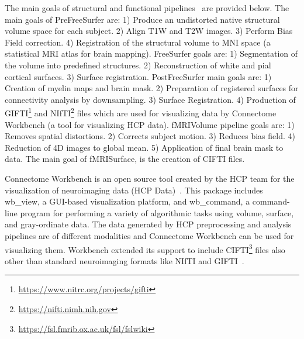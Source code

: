 The main goals of structural and functional pipelines~\cite{Gla13} are provided below. The main goals of PreFreeSurfer are: 1) Produce an undistorted native structural volume space for each subject. 2) Align T1W and T2W images. 3) Perform Bias Field correction. 4) Registration of the structural volume to MNI space (a statistical MRI atlas for brain mapping). FreeSurfer goals are: 1) Segmentation of the volume into predefined structures. 2) Reconstruction of white and pial cortical surfaces. 3) Surface registration. PostFreeSurfer main goals are: 1) Creation of myelin maps and brain mask. 2) Preparation of registered surfaces for connectivity analysis by downsampling. 3) Surface Registration. 4) Production of GIFTI\footnote{\url{https://www.nitrc.org/projects/gifti}} and NIfTI\footnote{\url{https://nifti.nimh.nih.gov}} files which are used for visualizing data by Connectome Workbench (a tool for visualizing HCP data). fMRIVolume pipeline goals are: 1) Removes spatial distortions. 2) Corrects subject motion. 3) Reduces bias field. 4) Reduction of 4D images to global mean. 5) Application of final brain mask to data. The main goal of fMRISurface, is the creation of CIFTI files.

Connectome Workbench is an open source tool created by the HCP team for the visualization of neuroimaging data (HCP Data)~\cite{wb_workbench}. This package includes wb\_view, a GUI-based visualization platform, and wb\_command, a command-line program for performing a variety of algorithmic tasks using volume, surface, and gray-ordinate data. The data generated by HCP preprocessing and analysis pipelines are of different modalities and Connectome Workbench can be used for visualizing them. Workbench extended its support to include CIFTI\footnote{\url{https://fsl.fmrib.ox.ac.uk/fsl/fslwiki}} files also other than standard neuroimaging formats like NIfTI and GIFTI~\cite{journals/neuroimage/MarcusHSJWGBABRHHHOMHHRHCSECE13}.
 

